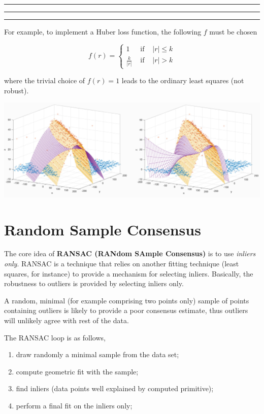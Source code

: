 \documentclass[10pt]{report}
\begin{document}
\vspace*{0.6cm}\hrule
\hrule
\hrule
\vspace*{0.4cm}

For example, to implement a Huber loss function, the following \(f\)
must be chosen

\[ f(r) = \left\{ \begin{array}{lll} 1 & \mbox{ if } &  |r| \leq k\\ \displaystyle\frac{k}{|r|} & \mbox{ if } & |r| > k \end{array} \right. \]

where the trivial choice of \(f(r) = 1\) leads to the ordinary least
squares (not robust).

\begin{center}
\includegraphics[width=.9\linewidth]{./pics/fit/robustness-example.jpg}
\end{center}

\section{Random Sample Consensus}
\label{random-sample-consensus}
The core idea of \textbf{RANSAC (RANdom SAmple Consensus)} is to use \emph{inliers
only}. RANSAC is a technique that relies on another fitting technique
(least squares, for instance) to provide a mechanism for selecting
inliers. Basically, the robustness to outliers is provided by selecting
inliers only.

A random, minimal (for example comprising two points only) sample of
points containing outliers is likely to provide a poor consensus
estimate, thus outliers will unlikely agree with rest of the data.

The RANSAC loop is as follows,

\begin{enumerate}
\item draw randomly a minimal sample from the data set;
\item compute geometric fit with the sample;
\item find inliers (data points well explained by computed primitive);
\item perform a final fit on the inliers only;
\end{enumerate}
\end{document}
